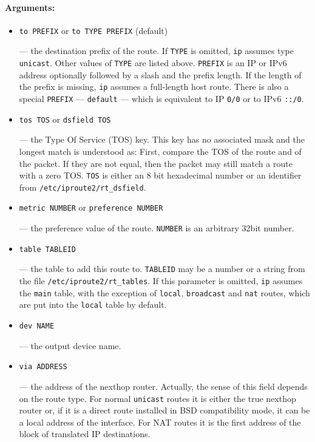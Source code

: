 \paragraph{Arguments:}
\begin{itemize}
\item \verb|to PREFIX| or \verb|to TYPE PREFIX| (default)

--- the destination prefix of the route. If \verb|TYPE| is omitted,
\verb|ip| assumes type \verb|unicast|. Other values of \verb|TYPE|
are listed above. \verb|PREFIX| is an IP or IPv6 address optionally followed
by a slash and the prefix length. If the length of the prefix is missing,
\verb|ip| assumes a full-length host route. There is also a special
\verb|PREFIX| --- \verb|default| --- which is equivalent to IP \verb|0/0| or
to IPv6 \verb|::/0|.

\item \verb|tos TOS| or \verb|dsfield TOS|

--- the Type Of Service (TOS) key. This key has no associated mask and
the longest match is understood as: First, compare the TOS
of the route and of the packet. If they are not equal, then the packet
may still match a route with a zero TOS. \verb|TOS| is either an 8 bit hexadecimal
number or an identifier from {\tt /etc/iproute2/rt\_dsfield}.


\item \verb|metric NUMBER| or \verb|preference NUMBER|

--- the preference value of the route. \verb|NUMBER| is an arbitrary 32bit number.

\item \verb|table TABLEID|

--- the table to add this route to.
\verb|TABLEID| may be a number or a string from the file
\verb|/etc/iproute2/rt_tables|. If this parameter is omitted,
\verb|ip| assumes the \verb|main| table, with the exception of
\verb|local|, \verb|broadcast| and \verb|nat| routes, which are
put into the \verb|local| table by default.

\item \verb|dev NAME|

--- the output device name.

\item \verb|via ADDRESS|

--- the address of the nexthop router. Actually, the sense of this field depends
on the route type. For normal \verb|unicast| routes it is either the true nexthop
router or, if it is a direct route installed in BSD compatibility mode,
it can be a local address of the interface.
For NAT routes it is the first address of the block of translated IP destinations.


\end{itemize}
